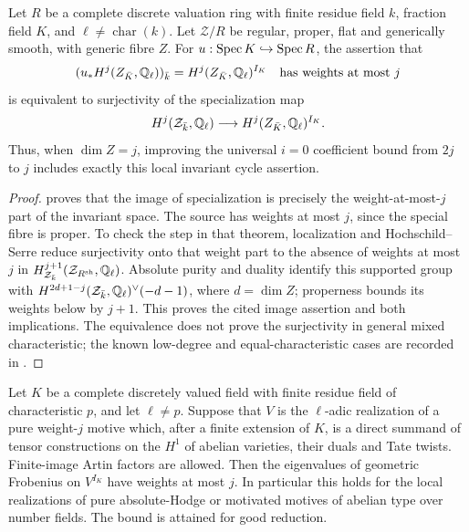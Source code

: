 \begin{proposition}
\label{c:lic-endpoint}
Let $R$ be a complete discrete valuation ring with finite residue field $k$, fraction field $K$, and $\ell\ne\operatorname{char}(k)$. Let $\mathcal Z/R$ be regular, proper, flat and generically smooth, with generic fibre $Z$. For $u:\operatorname{Spec} K\hookrightarrow\operatorname{Spec} R$, the assertion that
\[
 (u_*H^j(Z_{\bar K},\mathbb Q_\ell))_{\bar k}
       =H^j(Z_{\bar K},\mathbb Q_\ell)^{I_K}
 \quad\text{has weights at most }j
\]
is equivalent to surjectivity of the specialization map
\[
 H^j(\mathcal Z_{\bar k},\mathbb Q_\ell)
       \longrightarrow H^j(Z_{\bar K},\mathbb Q_\ell)^{I_K}.
\]
Thus, when $\dim Z=j$, improving the universal $i=0$ coefficient bound from $2j$ to $j$ includes exactly this local invariant cycle assertion.
\end{proposition}

\begin{proof}
\citet[Theorem 10.1(a), pp.~77--80 of the opened author version]{c_flachmorin2012topos} proves that the image of specialization is precisely the weight-at-most-$j$ part of the invariant space. The source has weights at most $j$, since the special fibre is proper. To check the step in that theorem, localization and Hochschild--Serre reduce surjectivity onto that weight part to the absence of weights at most $j$ in $H^{j+1}_{\mathcal Z_{\bar k}}(\mathcal Z_{R^{\rm sh}},\mathbb Q_\ell)$. Absolute purity and duality identify this supported group with $H^{2d+1-j}(\mathcal Z_{\bar k},\mathbb Q_\ell)^\vee(-d-1)$, where $d=\dim Z$; properness bounds its weights below by $j+1$. This proves the cited image assertion and both implications. The equivalence does not prove the surjectivity in general mixed characteristic; the known low-degree and equal-characteristic cases are recorded in \citet[\S3.1, p.~494]{c_esnaultwittenberg2016}.
\end{proof}

\begin{proposition}
\label{c:abelian-invariant-weights}
Let $K$ be a complete discretely valued field with finite residue field of
characteristic $p$, and let $\ell\ne p$.  Suppose that $V$ is the
$\ell$-adic realization of a pure weight-$j$ motive which, after a finite
extension of $K$, is a direct summand of tensor constructions on the
$H^1$ of abelian varieties, their duals and Tate twists.  Finite-image
Artin factors are allowed.  Then the eigenvalues of geometric Frobenius
on $V^{I_K}$ have weights at most $j$.  In particular this holds for the
local realizations of pure absolute-Hodge or motivated motives of abelian
type over number fields.  The bound is attained for good reduction.
\end{proposition}

